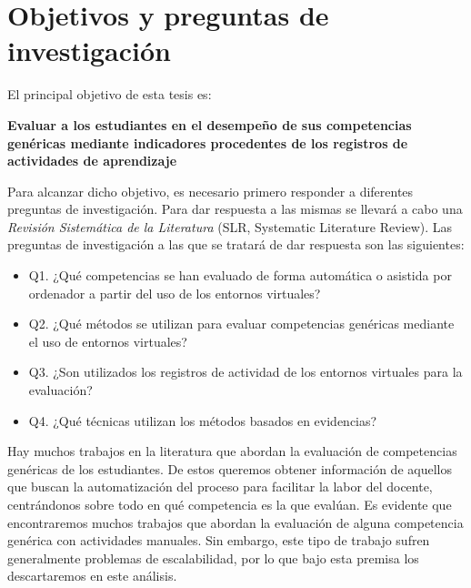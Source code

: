 
\section{Objetivos y preguntas de investigación}
\label{sec:objetivos}

El principal objetivo de esta tesis es:

\bigskip
\textbf{Evaluar a los estudiantes en el desempeño de sus competencias genéricas mediante indicadores procedentes de los registros de actividades de aprendizaje}
\bigskip

Para alcanzar dicho objetivo, es necesario primero responder a diferentes preguntas de investigación. Para dar respuesta a las mismas se llevará a cabo una \emph{Revisión Sistemática de la Literatura} (SLR, Systematic Literature Review). Las preguntas de investigación a las que se tratará de dar respuesta son las siguientes:

\begin{itemize}
\item Q1. ¿Qué competencias se han evaluado de forma automática o asistida por ordenador a partir del uso de los entornos virtuales?
\item Q2. ¿Qué métodos se utilizan para evaluar competencias genéricas mediante el uso de entornos virtuales?
\item Q3. ¿Son utilizados los registros de actividad de los entornos virtuales para la evaluación?
\item Q4. ¿Qué técnicas utilizan los métodos basados en evidencias?
\end{itemize}

Hay muchos trabajos en la literatura que abordan la evaluación de competencias genéricas de los estudiantes. De estos queremos obtener información de aquellos que buscan la automatización del proceso para facilitar la labor del docente, centrándonos sobre todo en qué competencia es la que evalúan. Es evidente que encontraremos muchos trabajos que abordan la evaluación de alguna competencia genérica con actividades manuales. Sin embargo, este tipo de trabajo sufren generalmente problemas de escalabilidad, por lo que bajo esta premisa los descartaremos en este análisis.





